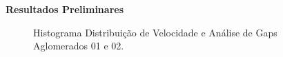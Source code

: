 \documentclass[xcolor=dvipsnames,10pt]{beamer}
\begin{document}
\begin{frame}{\textbf{Resultados Preliminares}}
  \begin{figure}[!htbp]
    \centering
    \caption{Histograma Distribuição de Velocidade e Análise de Gaps Aglomerados 01 e 02.}
  \end{figure}
\end{frame}
\end{document}
